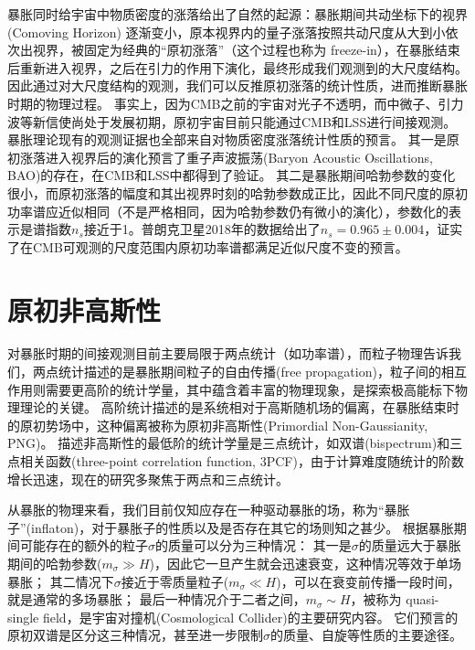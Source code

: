 暴胀同时给宇宙中物质密度的涨落给出了自然的起源：暴胀期间共动坐标下的视界 (Comoving Horizon) 逐渐变小，原本视界内的量子涨落按照共动尺度从大到小依次出视界，被固定为经典的“原初涨落”（这个过程也称为 freeze-in），在暴胀结束后重新进入视界，之后在引力的作用下演化，最终形成我们观测到的大尺度结构。
因此通过对大尺度结构的观测，我们可以反推原初涨落的统计性质，进而推断暴胀时期的物理过程。
事实上，因为CMB之前的宇宙对光子不透明，而中微子、引力波等新信使尚处于发展初期，原初宇宙目前只能通过CMB和LSS进行间接观测。
暴胀理论现有的观测证据也全部来自对物质密度涨落统计性质的预言。%
其一是原初涨落进入视界后的演化预言了重子声波振荡(Baryon Acoustic Oscillations, BAO)的存在，在CMB和LSS中都得到了验证。
其二是暴胀期间哈勃参数的变化很小，而原初涨落的幅度和其出视界时刻的哈勃参数成正比，因此不同尺度的原初功率谱应近似相同（不是严格相同，因为哈勃参数仍有微小的演化），参数化的表示是谱指数$n_s$接近于1。普朗克卫星2018年的数据给出了$n_s=0.965\pm0.004$\cite{planck18}，证实了在CMB可观测的尺度范围内原初功率谱都满足近似尺度不变的预言。

\section{原初非高斯性} %

对暴胀时期的间接观测目前主要局限于两点统计（如功率谱），而粒子物理告诉我们，两点统计描述的是暴胀期间粒子的自由传播(free propagation)，粒子间的相互作用则需要更高阶的统计学量，其中蕴含着丰富的物理现象，是探索极高能标下物理理论的关键\cite{meerburg2019PNG}。
高阶统计描述的是系统相对于高斯随机场的偏离，在暴胀结束时的原初势场中，这种偏离被称为原初非高斯性(Primordial Non-Gaussianity, PNG)。
描述非高斯性的最低阶的统计学量是三点统计，如双谱(bispectrum)和三点相关函数(three-point correlation function, 3PCF)，由于计算难度随统计的阶数增长迅速，现在的研究多聚焦于两点和三点统计。

从暴胀的物理来看，我们目前仅知应存在一种驱动暴胀的场，称为“暴胀子”(inflaton)，对于暴胀子的性质以及是否存在其它的场则知之甚少。
根据暴胀期间可能存在的额外的粒子$\sigma$的质量可以分为三种情况：
其一是$\sigma$的质量远大于暴胀期间的哈勃参数($m_\sigma \gg H$)，因此它一旦产生就会迅速衰变，这种情况等效于单场暴胀；
其二情况下$\sigma$接近于零质量粒子($m_\sigma \ll H$)，可以在衰变前传播一段时间，就是通常的多场暴胀；
最后一种情况介于二者之间，$m_\sigma \sim H$，被称为 quasi-single field，是宇宙对撞机(Cosmological Collider)的主要研究内容\cite{arkani-hamed2015coco}。
它们预言的原初双谱是区分这三种情况，甚至进一步限制$\sigma$的质量、自旋等性质的主要途径。

